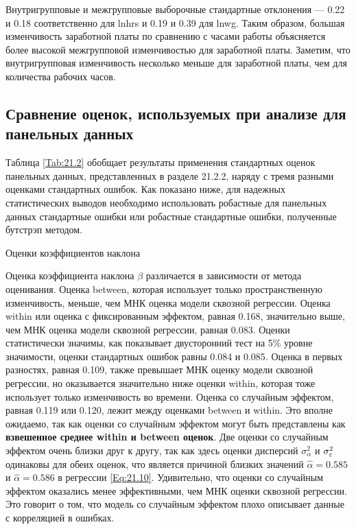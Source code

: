 Внутригрупповые и межгрупповые выборочные стандартные отклонения --- 0.22 и 0.18 соответственно для lnhrs и 0.19 и 0.39 для lnwg. Таким образом, большая изменчивость заработной платы по сравнению с часами работы объясняется более высокой межгрупповой изменчивостью для заработной платы. Заметим, что внутригрупповая изменчивость несколько меньше для заработной платы, чем для количества рабочих часов.

\subsection{Сравнение оценок, используемых при анализе для панельных данных}
Таблица \ref{Tab:21.2} обобщает результаты применения стандартных оценок панельных данных, представленных в разделе 21.2.2, наряду с тремя разными оценками стандартных ошибок. Как показано ниже, для надежных статистических выводов необходимо использовать робастные для панельных данных стандартные ошибки  или робастные стандартные ошибки, полученные бутстрэп методом.

{\centering
Оценки коэффициентов наклона\\}

Оценка коэффициента наклона $\beta$ различается в зависимости от метода оценивания.  Оценка between, которая использует только пространственную изменчивость, меньше, чем МНК оценка модели сквозной регрессии. Оценка within или оценка с фиксированным эффектом, равная 0.168, значительно выше, чем МНК оценка модели сквозной регрессии, равная 0.083. Оценки статистически значимы, как показывает двусторонний тест на 5\% уровне значимости, оценки стандартных ошибок равны 0.084 и 0.085. %
Оценка в первых разностях, равная 0.109, также превышает МНК оценку модели сквозной регрессии, но оказывается значительно ниже оценки within, которая тоже использует только изменчивость во времени. Оценка со случайным эффектом, равная 0.119 или 0.120, лежит между оценками between и within. Это вполне ожидаемо, так как оценки со случайным эффектом могут быть представлены как \textbf{взвешенное среднее within и between оценок}. Две оценки со случайным эффектом очень близки друг к другу, так как здесь оценки дисперсий $\sigma^2_{\alpha}$ и $\sigma^2_{\varepsilon}$ одинаковы для обеих оценок, что является причиной близких значений $\hat{\alpha}=0.585$ и $\hat{\alpha}=0.586$ в регрессии \ref{Eq:21.10}. Удивительно, что оценки со случайным эффектом оказались менее эффективными, чем МНК оценки сквозной регрессии. Это говорит о том, что модель со случайным эффектом плохо описывает данные с корреляцией в ошибках. 

